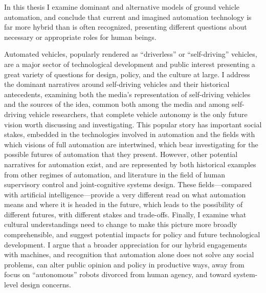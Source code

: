 % 
% 
%
In this thesis I examine dominant and alternative models of ground
vehicle automation, and conclude that current and imagined automation
technology is far more hybrid than 
is often recognized, presenting different questions about necessary or
appropriate roles for human beings.

Automated vehicles, popularly rendered as ``driverless'' or
``self-driving'' vehicles, are a major sector of technological
development and public interest presenting a great variety of
questions for design, policy, and the culture at large. I address the
dominant narratives around self-driving 
vehicles and their historical antecedents, examining both the media's representation
of self-driving vehicles and 
the sources of the idea, common both among the media and among
self-driving vehicle researchers, that complete vehicle autonomy is
the only future vision worth discussing and investigating.
This popular story has important social stakes, embedded in the
technologies involved in 
automation and the fields with which visions of full automation are
intertwined, which bear investigating for the possible futures of
automation that they present.
However, other potential narratives for automation exist, and are
represented by both historical examples from other regimes of
automation, and
literature in the field of human supervisory control and
joint-cognitive systems design. These fields---compared with
artificial intelligence---provide a very
different read on what automation means and where it is headed in the
future, which leads to the possibility of different futures, with
different stakes and trade-offs. Finally, I examine what cultural
understandings need to change to 
make this picture more broadly comprehensible, and suggest potential
impacts for policy and future technological development. I argue that
a broader appreciation for 
our hybrid engagements with machines, and recognition that automation
alone does not solve any social problems, can alter public
opinion and policy in productive ways, away from focus on
``autonomous'' robots divorced from human agency, and toward
system-level design concerns. 

